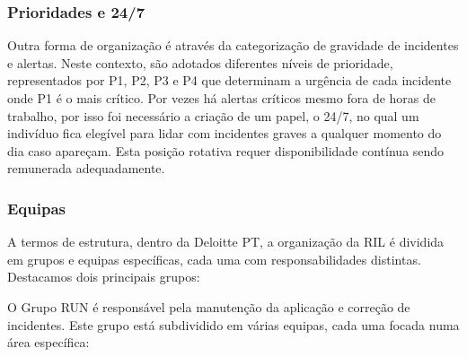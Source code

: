         \subsubsection{Prioridades e 24/7}


            Outra forma de organização é através da categorização de gravidade de incidentes e alertas. Neste contexto, são adotados diferentes níveis de prioridade, representados por P1, P2, P3 e P4 que determinam a urgência de cada incidente onde P1 é o mais crítico. Por vezes há alertas críticos mesmo fora de horas de trabalho, por isso foi necessário a criação de um papel, o 24/7, no qual um indivíduo fica elegível para lidar com incidentes graves a qualquer momento do dia caso apareçam. Esta posição rotativa requer disponibilidade contínua sendo remunerada adequadamente.

        \subsubsection{Equipas}

            A termos de estrutura, dentro da Deloitte PT, a organização da RIL é dividida em grupos e equipas específicas, cada uma com responsabilidades distintas. Destacamos dois principais grupos:


                O Grupo RUN é responsável pela manutenção da aplicação e correção de incidentes. Este grupo está subdividido em várias equipas, cada uma focada numa área específica:

